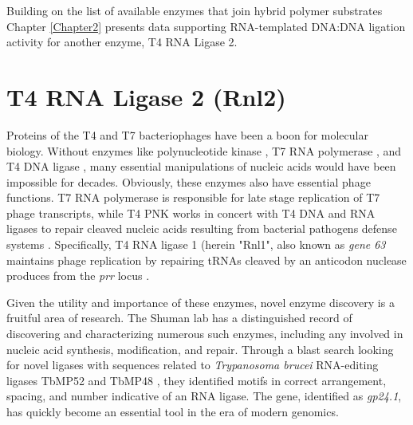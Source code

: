 Building on the list of available enzymes that join hybrid polymer substrates Chapter \ref{Chapter2} presents data supporting RNA-templated DNA:DNA ligation activity for another enzyme, T4 RNA Ligase 2.

\section{T4 RNA Ligase 2 (Rnl2)}\label{sec:Rnl2}

Proteins of the T4 and T7 bacteriophages have been a boon for molecular biology. Without enzymes like polynucleotide kinase \citep{Richardson1965a}, T7 RNA polymerase \citep{Summers1970b}, and T4 DNA ligase \citep{Weiss1967a}, many essential manipulations of nucleic acids would have been impossible for decades. Obviously, these enzymes also have essential phage functions. T7 RNA polymerase is responsible for late stage replication of T7 phage transcripts, while T4 PNK works in concert with T4 DNA and RNA ligases to repair cleaved	nucleic acids resulting from bacterial pathogens defense systems \citep{Wang2002b}. Specifically, T4 RNA ligase 1 (herein "Rnl1", also known as \textit{gene 63} maintains phage replication by repairing tRNAs cleaved by an anticodon nuclease produces from the \textit{prr} locus \citep{Amitsur1987d}.

Given the utility and importance of these enzymes, novel enzyme discovery is a fruitful area of research. The Shuman lab has a distinguished record of discovering and characterizing numerous such enzymes, including any involved in nucleic acid synthesis, modification, and repair. Through a blast search looking for novel ligases with sequences related to \textit{Trypanosoma brucei} RNA-editing ligases TbMP52 and TbMP48 \citep{Ho2002b}, they identified motifs in correct arrangement, spacing, and number indicative of an RNA ligase. The gene, identified as \textit{gp24.1}, has quickly become an essential tool in the era of modern genomics.

